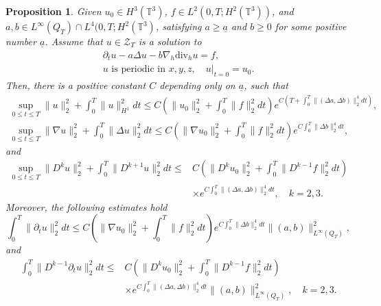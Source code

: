 \documentclass[12pt,reqno]{amsart}
\numberwithin{equation}{section}
\newtheorem{proposition}[theorem]{Proposition}
\begin{document}
\begin{proposition}
  \label{PROPA2-1}
  Given $u_0\in H^3(\mathbb T^3)$, $f\in L^2(0,T; H^2(\mathbb T^3))$, and $a,b\in L^\infty(Q_T)\cap L^4(0,T; H^2(\mathbb T^3)$, satisfying $a\geq\underline a$ and $b\geq0$ for some positive number $\underline a$. Assume
  that $u\in\mathscr{Z}_T$ is a solution to
  \begin{eqnarray}
    \partial_tu-a\Delta u-b\nabla_h\text{div}_hu=f,\label{A2-1}\\
    u \text{ is  periodic in }x,y,z,\quad u|_{t=0}=u_0.\nonumber
  \end{eqnarray}
  Then, there is a positive constant $C$ depending only on $\underline a$, such that
  \begin{eqnarray*}
    \sup_{0\leq t\leq T}\|u\|_2^2+\int_0^T\|u\|_{H^1}^2dt \leq  C\left(\|u_0\|_2^2+\int_0^T\|f\|_2^2dt\right)e^{C\left(T+\int_0^T\|(\Delta a,\Delta b)\|_2^4dt\right)}, \\
    \sup_{0\leq t\leq T}\|\nabla u\|_2^2+\int_0^T\|\Delta u\|_2^2dt \leq C\left(\|\nabla u_0\|_2^2+\int_0^T\|f\|_2^2dt\right)e^{C \int_0^T\|\Delta b\|_2^4dt},
  \end{eqnarray*}
and
  \begin{align*}
    \sup_{0\leq t\leq T}\|D^k u\|_2^2+\int_0^T\|D^{k+1} u\|_2^2dt
    \leq& C\left(\|D^ku_0\|_2^2+\int_0^T\|D^{k-1} f\|_2^2dt\right)\\
    &\times e^{C \int_0^T\|(\Delta a,\Delta b)\|_2^4dt },\quad k=2,3.
  \end{align*}
Moreover, the following estimates hold
$$
    \int_0^T\|\partial_tu\|_2^2dt \leq  C\left(\|\nabla u_0\|_2^2+\int_0^T\|f\|_2^2dt\right)e^{C \int_0^T\|\Delta b\|_2^4dt}\|(a,b)\|_{L^\infty(Q_T)}^2 ,
$$
and
\begin{align*}
    \int_0^T\|D^{k-1} \partial_tu\|_2^2dt\leq&  C\left(\|D^ku_0\|_2^2+\int_0^T\|D^{k-1} f\|_2^2dt\right)\\
    &\times e^{C \int_0^T\|(\Delta a,\Delta b)\|_2^4dt}\|(a,b)\|_{L^\infty(Q_T)}^2,\quad k=2,3.
\end{align*}
\end{proposition}
\end{document}
